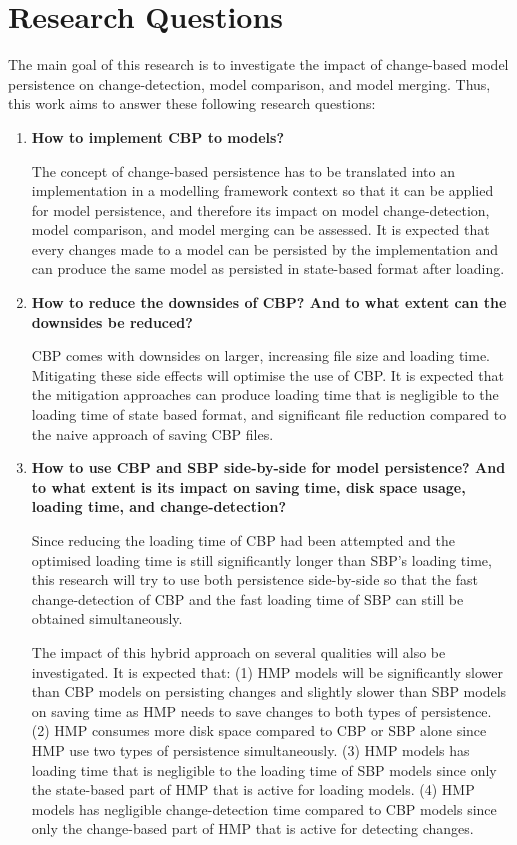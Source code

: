 \documentclass[12pt, a4paper]{report} \usepackage[titletoc]{appendix}
\begin{document}
\section{Research Questions}
\label{sec:research_questions}
The main goal of this research is to investigate the impact of change-based model persistence on change-detection, model comparison, and model merging. Thus, this work aims to answer these following research questions: 
\begin{enumerate} 
	\item \textbf{How to implement CBP to models?} 
	
	The concept of change-based persistence has to be translated into an implementation in a modelling framework context so that it can be applied for model persistence, and therefore its impact on model change-detection, model comparison, and model merging can be assessed. It is expected that every changes made to a model can be persisted by the implementation and can produce the same model as persisted in state-based format after loading.
	
	\item \textbf{How to reduce the downsides of CBP? And to what extent can the downsides be reduced?} 
	
	CBP comes with downsides on larger, increasing file size and loading time. Mitigating these side effects will optimise the use of CBP. It is expected that the mitigation approaches can produce loading time that is negligible to the loading time of state based format, and significant file reduction compared to the naive approach of saving CBP files. 
	
	\item \textbf{How to use CBP and SBP side-by-side for model persistence? And to what extent is its impact on saving time, disk space usage, loading time, and change-detection?} 
	
	Since reducing the loading time of CBP had been attempted and the optimised loading time is still significantly longer than SBP's loading time, this research will try to use both persistence side-by-side so that the fast change-detection of CBP and the fast loading time of SBP can still be obtained simultaneously. 
	
	The impact of this hybrid approach on several qualities will also be investigated. It is expected that: (1) HMP models will be significantly slower than CBP models on persisting changes and slightly slower than SBP models on saving time as HMP needs to save changes to both types of persistence. (2) HMP consumes more disk space compared to CBP or SBP alone since HMP use two types of persistence simultaneously. (3) HMP models has loading time that is negligible to the loading time of SBP models since only the state-based part of HMP that is active for loading models. (4) HMP models has negligible change-detection time compared to CBP models since only the change-based part of HMP that is active for detecting changes.        
	

\end{enumerate}
\end{document}
